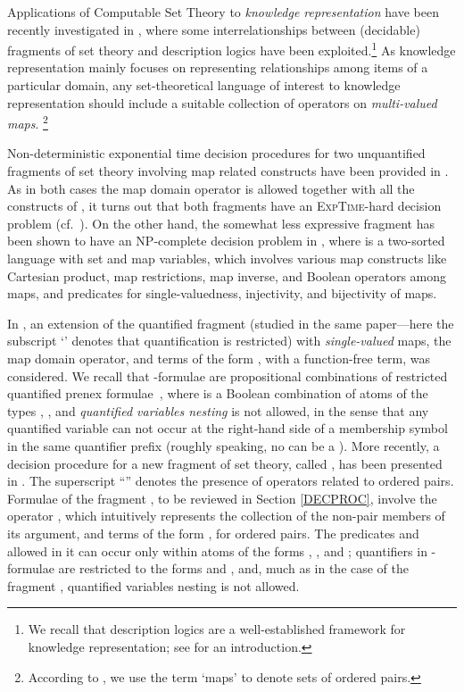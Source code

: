 \documentclass[submission,copyright,creativecommons]{eptcs}
\newcommand{\corr}[1]{#1}
\begin{document}
Applications of Computable Set Theory to \emph{knowledge
representation} have been recently investigated in
\cite{CanLonPis2010, CanLonNic2011}, where some interrelationships
between (decidable) fragments of set theory and description logics
have been exploited.\footnote{We recall that description logics are a
well-established framework for knowledge representation; see
\cite{DLHANDBOOK2} for an introduction.}
As knowledge representation mainly focuses on representing
relationships among items of a particular domain, any set-theoretical
language of interest to knowledge representation should include a
suitable collection of operators on \emph{multi-valued
maps}.
\footnote{According to \cite{SchDewSchDub1986}, we use the term
`maps' to denote sets of ordered pairs.}

Non-deterministic exponential time decision procedures for two
unquantified fragments of set theory involving map related constructs
have been provided in \cite{FOS80, CanSch91}.  As in both
cases the map domain operator is allowed together with all the
constructs of \mls, it turns out that both fragments have an
\textsc{ExpTime}-hard decision problem (cf.\ \cite{CanLonNic2010}).
On the other hand, the somewhat less expressive fragment \mlsscart has
been shown to have an \textsc{NP}-complete decision problem in
\cite{CanLonNic2010}, where \mlsscart is a two-sorted
language with set and map variables, which involves various map
constructs like Cartesian product, map restrictions, map inverse, and
Boolean operators among maps, and predicates for single-valuedness,
injectivity, and bijectivity of maps.

In \cite{BreFerOmoSch1981}, an extension of the quantified fragment
 (studied in the same paper---here the subscript `' 
denotes that quantification is restricted) with \emph{single-valued}
maps, the map domain operator, and terms of the form , with 
a function-free term, was considered.  We recall that
-formulae are propositional combinations of restricted
quantified prenex formulae
\,,
where  is a Boolean combination of atoms of the types ,
, \corr{and \emph{quantified variables nesting} is not allowed, in the 
sense that any quantified variable  can not occur at the
right-hand side of a membership symbol  in the same quantifier prefix
(roughly speaking, no  can be a )}. 
More recently, a decision procedure for a new fragment of set theory,
called , has been presented in \cite{CanLonNic2011}.
\corr{The superscript ``'' denotes the presence of operators
related to ordered pairs.} Formulae of the fragment ,
to be reviewed in Section \ref{DECPROC}, involve the operator
, which intuitively represents the collection of the
non-pair members of its argument, and terms of the form , for
ordered pairs.  The predicates  and  allowed in it can occur
only within atoms of the forms , , and ; quantifiers in \Forallpizero-formulae are restricted to the
forms  and , and,
much as in the case of the fragment , quantified
variables nesting is not allowed.
\end{document}
